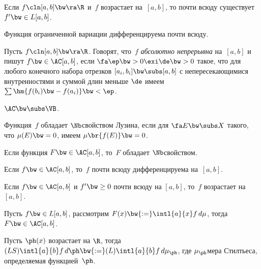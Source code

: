 \documentclass[a4paper,draft]{article}
\begin{document}
\begin{theorem}
  Если $f\cln [a,b]\bw\ra \R$ и~$f$ возрастает на~$[a,b]$, то почти всюду
  существует $f' \bw\in L[a,b]$.
\end{theorem}

\begin{imp}
  Функция ограниченной вариации дифференцируема почти всюду.
\end{imp}

\begin{df}
  Пусть $f\cln [a,b]\bw\ra \R$. Говорят, что~$f$ \emph{абсолютно непрерывна} на~$[a,b]$ и
  пишут $f \bw\in \AC[a,b]$, если $\fa\ep \bw> 0 \exi\de \bw> 0$ такое, что для любого
  конечного набора отрезков $[a_i,b_i] \bw\subs [a,b]$ с непересекающимися внутренностями
  и суммой длин меньше $\de$ имеем $\sum\hm{f(b_i) \bw- f(a_i)} \bw< \ep$.
\end{df}

\begin{theorem}
  $\AC \bw\subs \VB$.
\end{theorem}

\begin{df}
  Функция~$f$ обладает $\Nb$\д свойством Лузина, если для $\fa E \bw\subs X$ такого, что
  $\mu(E) \bw= 0$, имеем $\mu\br{f(E)} \bw= 0$.
\end{df}

\begin{theorem}
  Если функция $F \bw\in \AC[a,b]$, то~$F$ обладает $\Nb$\д свойством.
\end{theorem}

\begin{note}
  Если $f \bw\in \AC[a,b]$, то~$f$ почти всюду дифференцируема на~$[a,b]$.
\end{note}

\begin{theorem}
  Если $f \bw\in \AC[a,b]$ и $f' \bw\ge 0$ почти всюду на $[a,b]$, то~$f$ возрастает на~$[a,b]$.
\end{theorem}

\begin{theorem}
  Пусть $f \bw\in L[a,b]$, рассмотрим $F(x) \bw{:=} \intl{a}{x} f\,d\mu$, тогда $F \bw\in \AC[a,b]$.
\end{theorem}

\begin{df}
  Пусть $\ph(x)$ возрастает на $\R$, тогда $(LS) \intl{a}{b} f\,d\ph \bw{:=}
  (L)\intl{a}{b} f\,d\mu_\ph$, где $\mu_\ph$\т мера Стилтьеса,
  определяемая функцией~$\ph$.
\end{df}
\end{document}
